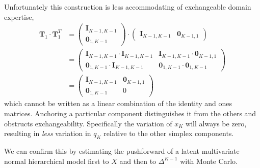 \documentclass[
  letterpaper,
  DIV=11,
  numbers=noendperiod]{scrartcl}
\begin{document}
Unfortunately this construction is less accommodating of exchangeable
domain expertise, \begin{align*}
\mathbf{T}_{1} \cdot \mathbf{T}_{1}^{T}
&=
\begin{pmatrix}
\mathbf{I}_{K - 1, K - 1} \\
\mathbf{0}_{1, K - 1}
\end{pmatrix}
\cdot
\begin{pmatrix}
\mathbf{I}_{K - 1, K - 1} &
\mathbf{0}_{K - 1, 1}
\end{pmatrix}
\\
&=
\begin{pmatrix}
\mathbf{I}_{K - 1, K - 1} \cdot \mathbf{I}_{K - 1, K - 1} &
\mathbf{I}_{K - 1, K - 1} \cdot \mathbf{0}_{K - 1, 1} \\
\mathbf{0}_{1, K - 1} \cdot \mathbf{I}_{K - 1, K - 1} &
\mathbf{0}_{1, K - 1} \cdot \mathbf{0}_{1, K - 1}
\end{pmatrix}
\\
&=
\begin{pmatrix}
\mathbf{I}_{K - 1, K - 1} &
\mathbf{0}_{K - 1, 1} \\
\mathbf{0}_{1, K - 1} &
0
\end{pmatrix}
\end{align*} which cannot be written as a linear combination of the
identity and ones matrices. Anchoring a particular component
distinguishes it from the others and obstructs exchangeability.
Specifically the variation of \(x_{K}\) will always be zero, resulting
in \emph{less} variation in \(q_{K}\) relative to the other simplex
components.

We can confirm this by estimating the pushforward of a latent
multivariate normal hierarchical model first to \(X\) and then to
\(\Delta^{K - 1}\) with Monte Carlo.
\end{document}
